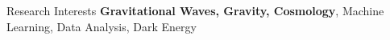 \begin{rubric}{Research Interests}
\noindent \textbf{Gravitational Waves, Gravity, Cosmology}, Machine Learning, Data Analysis, Dark Energy
\end{rubric}